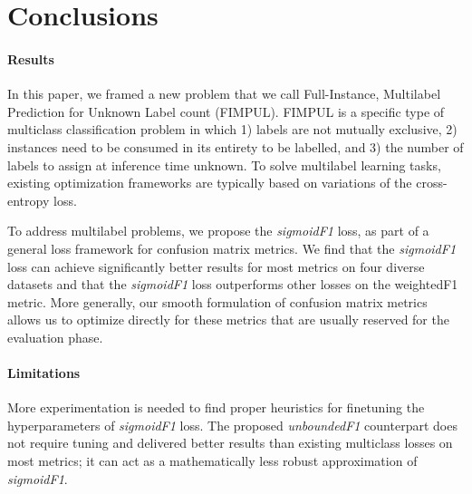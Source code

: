 
\section{Conclusions}
\label{sec:orged3d8a1}


\paragraph{Results}
In this paper, we framed a new problem that we call Full-Instance, Multilabel Prediction for Unknown Label count (FIMPUL). FIMPUL is a specific type of multiclass classification problem in which 1) labels are not mutually exclusive, 2) instances need to be consumed in its entirety to be labelled,
and 3) the number of labels to assign at inference time unknown.
To solve multilabel learning tasks, existing optimization frameworks are typically based on variations of the cross-entropy loss.

To address multilabel problems, we propose the \emph{sigmoidF1} loss, as part of a general loss framework for confusion matrix metrics. We find that the \emph{sigmoidF1} loss can achieve significantly better results for most metrics on four diverse datasets and that the \emph{sigmoidF1} loss outperforms other losses on the weightedF1 metric.
More generally, our smooth formulation of confusion matrix metrics allows us to optimize directly for these metrics that are usually reserved for the evaluation phase.

\paragraph{Limitations}
More experimentation is needed to find proper heuristics for finetuning the hyperparameters of \emph{sigmoidF1} loss. The proposed \emph{unboundedF1} counterpart does not require tuning and delivered better results than existing multiclass losses on most metrics; it can act as a mathematically less robust approximation of \emph{sigmoidF1}.

